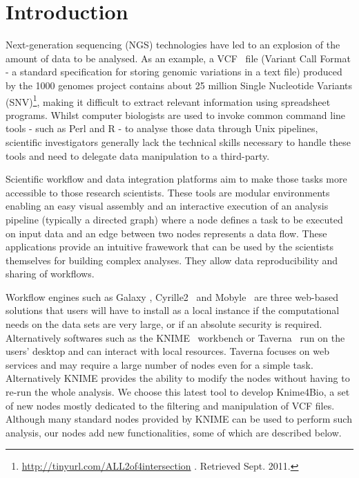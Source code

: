 \documentclass{bioinfo}
\begin{document}
\section{Introduction}

Next-generation sequencing (NGS) technologies have led to an explosion of the amount of data to be analysed. As an example, a VCF~\citep{pmid21653522} file (Variant Call Format - a standard specification for storing genomic variations in a text file) produced by the 1000 genomes project contains about 25 million Single Nucleotide Variants (SNV)\footnote{\href{ftp://ftp-trace.ncbi.nih.gov/1000genomes/ftp/release/20100804/ALL.2of4intersection.20100804.sites.vcf.gz}{http://tinyurl.com/ALL2of4intersection} . Retrieved Sept. 2011.}, making it difficult to extract relevant information using spreadsheet programs. Whilst computer biologists are used to invoke common command line tools - such as Perl and R - to analyse those data through Unix pipelines, scientific investigators generally lack the technical skills necessary to handle these tools and need to delegate data manipulation to a third-party. 

Scientific workflow and data integration platforms aim to make those tasks more accessible to those research scientists. These tools are modular environments enabling an easy visual assembly and an interactive execution of an analysis pipeline (typically a directed graph) where a node defines a task to be executed on input data and an edge between two nodes represents a data flow. These applications provide an intuitive frawework that can be used by the scientists themselves for building complex analyses. They allow data reproducibility and sharing of workflows.

Workflow engines such as Galaxy \citep{pmid21531983}, Cyrille2~\citep{pmid18269742} and Mobyle~\citep{pmid19689959} are three web-based solutions that users will have to install as a local instance if the computational needs on the data sets are very large, or if an absolute security is required. Alternatively  softwares such as the KNIME~\citep{knimeref} workbench or Taverna~\citep{pmid16845108}  run on the users' desktop and can interact with local resources. Taverna focuses on web services and may require a large number of nodes even for a simple task. Alternatively KNIME provides the ability to modify the nodes without having to re-run the whole analysis. We choose this latest tool to develop Knime4Bio, a set of new nodes mostly dedicated to the filtering and manipulation of VCF files. Although many standard nodes provided by KNIME can be used to perform such analysis, our nodes add new functionalities, some of which are described below.
\end{document}
